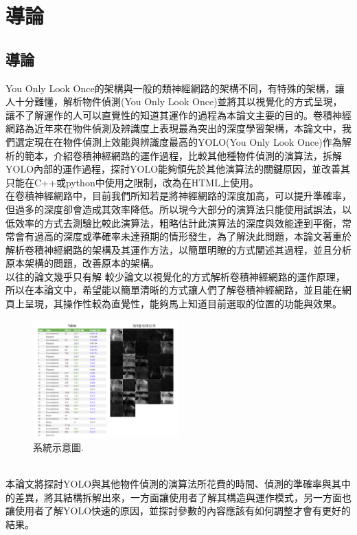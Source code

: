 \chapter{導論}
\label{c:1}

\section{導論}
You Only Look Once的架構與一般的類神經網路的架構不同，有特殊的架構，讓人十分難懂，解析物件偵測(You Only Look Once)並將其以視覺化的方式呈現，讓不了解運作的人可以直覺性的知道其運作的過程為本論文主要的目的。卷積神經網路為近年來在物件偵測及辨識度上表現最為突出的深度學習架構，本論文中，我們選定現在在物件偵測上效能與辨識度最高的YOLO(You Only Look Once)作為解析的範本，介紹卷積神經網路的運作過程，比較其他種物件偵測的演算法，拆解YOLO內部的運作過程，探討YOLO能夠領先於其他演算法的關鍵原因，並改善其只能在C++或python中使用之限制，改為在HTML上使用。
\\
在卷積神經網路中，目前我們所知若是將神經網路的深度加高，可以提升準確率，但過多的深度卻會造成其效率降低。所以現今大部分的演算法只能使用試誤法，以低效率的方式去測驗比較此演算法，粗略估計此演算法的深度與效能達到平衡，常常會有過高的深度或準確率未達預期的情形發生，為了解決此問題，本論文著重於解析卷積神經網路的架構及其運作方法，以簡單明瞭的方式闡述其過程，並且分析原本架構的問題，改善原本的架構。\\
以往的論文幾乎只有解
較少論文以視覺化的方式解析卷積神經網路的運作原理，所以在本論文中，希望能以簡單清晰的方式讓人們了解卷積神經網路，並且能在網頁上呈現，其操作性較為直覺性，能夠馬上知道目前選取的位置的功能與效果。
\begin{figure}[htpb!]
  \centering
    \includegraphics[width=0.5\textwidth]{fig/system1.png}
    \caption{\label{fig:系統1}系統示意圖.}
\end{figure}
\\本論文將探討YOLO與其他物件偵測的演算法所花費的時間、偵測的準確率與其中的差異，將其結構拆解出來，一方面讓使用者了解其構造與運作模式，另一方面也讓使用者了解YOLO快速的原因，並探討參數的內容應該有如何調整才會有更好的結果。\\
